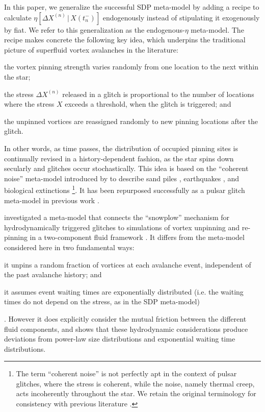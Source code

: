 In this paper, we generalize the successful SDP meta-model by adding a recipe to calculate $\eta[\Delta X^{(n)}\,|\,X(t_{n}^-)]$ endogenously instead of stipulating it exogenously by fiat. We refer to this generalization as the endogenous-$\eta$ meta-model. The recipe makes concrete the following key idea, which underpins the traditional picture of superfluid vortex avalanches in the literature: \begin{enumerate*} \item the vortex pinning strength varies randomly from one location to the next within the star; \item the stress $\Delta X^{(n)}$ released in a glitch is proportional to the number of locations where the stress $X$ exceeds a threshold, when the glitch is triggered; and \item the unpinned vortices are reassigned randomly to new pinning locations after the glitch. \end{enumerate*} In other words, as time passes, the distribution of occupied pinning sites is continually revised in a history-dependent fashion, as the star spins down secularly and glitches occur stochastically. This idea is based on the ``coherent noise'' meta-model introduced by \citet{Sneppen1997} to describe sand piles \citep{Newman1996}, earthquakes \citep{Newman1996}, and biological extinctions \citep{Newman1996a}\footnote{The term ``coherent noise'' is not perfectly apt in the context of pulsar glitches, where the stress is coherent, while the noise, namely thermal creep, acts incoherently throughout the star. We retain the original terminology for consistency with previous literature \citep{Sneppen1997, Melatos2009}.}. It has been repurposed successfully as a pulsar glitch meta-model in previous work \citep{Melatos2009}. 

\citet{Haskell2016} investigated a meta-model that connects the ``snowplow'' mechanism for hydrodynamically triggered glitches \citep{Pizzochero2011} to simulations of vortex unpinning and re-pinning in a two-component fluid framework \citep{Haskell2014}. It differs from the meta-model considered here in two fundamental ways: \begin{enumerate*} \item it unpins a random fraction of vortices at each avalanche event, independent of the past avalanche history; and \item it assumes event waiting times are exponentially distributed (i.e. the waiting times do not depend on the stress, as in the SDP  meta-model)\end{enumerate*}. However it does explicitly consider the mutual friction between the different fluid components, and shows that these hydrodynamic considerations produce deviations from power-law size distributions and exponential waiting time distributions.

